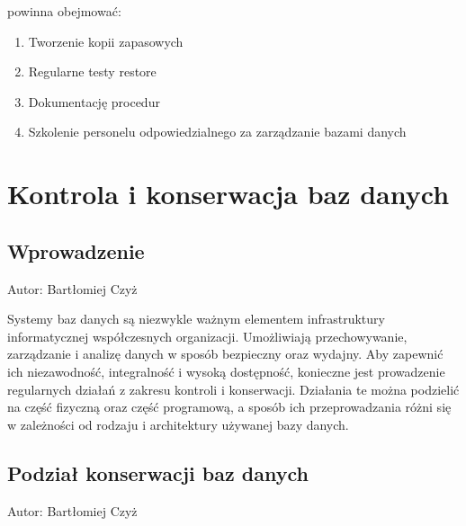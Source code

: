 \documentclass[letterpaper,10pt,polish]{sphinxmanual}
\begin{document}
\sphinxAtStartPar
{} powinna obejmować:
\begin{enumerate}
%
\item {} 
\sphinxAtStartPar
Tworzenie kopii zapasowych

\item {} 
\sphinxAtStartPar
Regularne testy restore

\item {} 
\sphinxAtStartPar
Dokumentację procedur

\item {} 
\sphinxAtStartPar
Szkolenie personelu odpowiedzialnego za zarządzanie bazami danych

\end{enumerate}

\sphinxstepscope


\section{Kontrola i konserwacja baz danych}
\label{\detokenize{rozdzial2/Kontrola_i_konserwacja/kontrola_i_konserwacja:kontrola-i-konserwacja-baz-danych}}\label{\detokenize{rozdzial2/Kontrola_i_konserwacja/kontrola_i_konserwacja::doc}}

\subsection{Wprowadzenie}
\label{\detokenize{rozdzial2/Kontrola_i_konserwacja/kontrola_i_konserwacja:wprowadzenie}}
\sphinxAtStartPar
Autor: Bartłomiej Czyż

\sphinxAtStartPar
Systemy baz danych są niezwykle ważnym elementem infrastruktury informatycznej współczesnych organizacji. Umożliwiają przechowywanie, zarządzanie i analizę danych w sposób bezpieczny oraz wydajny. Aby zapewnić ich niezawodność, integralność i wysoką dostępność, konieczne jest prowadzenie regularnych działań z zakresu kontroli i konserwacji. Działania te można podzielić na część fizyczną oraz część programową, a sposób ich przeprowadzania różni się w zależności od rodzaju i architektury używanej bazy danych.


\subsection{Podział konserwacji baz danych}
\label{\detokenize{rozdzial2/Kontrola_i_konserwacja/kontrola_i_konserwacja:podzial-konserwacji-baz-danych}}
\sphinxAtStartPar
Autor: Bartłomiej Czyż
\end{document}
